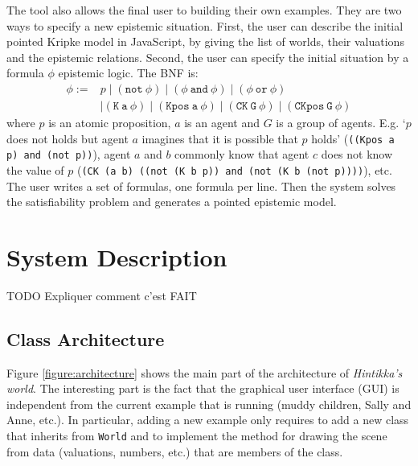\documentclass{article}
\begin{document}
The tool also allows the final user to building their own examples. They are two ways to specify a new epistemic situation. First, the user can describe the initial pointed Kripke model in JavaScript, by giving the list of worlds, their valuations and the epistemic relations. Second, the user can specify the initial situation by a formula $\phi$ epistemic logic. The BNF is:
%
%	
$$\begin{array}{ll}\phi := & p \mid (\mathtt{not~} \phi) \mid (\phi \mathtt {~and~} \phi) \mid (\phi \mathtt {~or~} \phi)  \\ & \mid \mathtt{(K~a~\phi)} \mid \mathtt{(Kpos~a~\phi)} \mid \mathtt{(CK~G~\phi)}\mid \mathtt{(CKpos~G~\phi)}\end{array}$$
%
where $p$ is an atomic proposition, $a$ is an agent and $G$ is a group of agents. E.g. `$p$ does not holds but agent $a$ imagines that it is possible that $p$ holds' (\texttt{((Kpos a p) and (not p))}), agent $a$ and $b$ commonly know that agent $c$ does not know the value of $p$ (\texttt{(CK (a b) ((not (K b p)) and (not (K b (not p))))}), etc. The user writes a set of formulas, one formula per line.
%
%	
Then the system solves the satisfiability problem and generates a pointed epistemic model.









\section{System Description}
\label{section:architecture}

TODO Expliquer comment c'est FAIT

\subsection{Class Architecture}

Figure \ref{figure:architecture} shows the main part of the architecture of \emph{Hintikka's world}. The interesting part is the fact that the graphical user interface (GUI) is independent from the current example that is running (muddy children, Sally and Anne, etc.). In particular, adding a new example only requires to add a new class that inherits from \texttt{World} and to implement the method for drawing the scene from data (valuations, numbers, etc.) that are members of the class.
\end{document}
